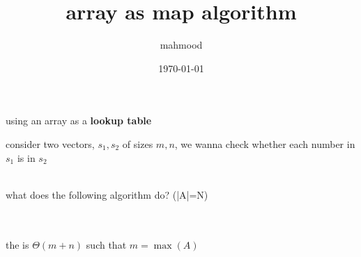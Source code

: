 \documentclass[a4paper,12pt]{article}
\author{mahmood}
\date{\today}
\title{array as map algorithm}
\begin{document}
\maketitle
using an array as a \textbf{lookup table}\\[0pt]
\begin{my_example}
consider two vectors, \(s_1,s_2\) of sizes \(m,n\), we wanna check whether each number in \(s_1\) is in \(s_2\)\\[0pt]
\\[0pt]
\end{my_example}
\begin{question}
what does the following algorithm do? (|A|=N)\\[0pt]
\\[0pt]

\begin{answer}
\\[0pt]

the is \(\Theta(m+n)\) such that \(m = \max(A)\)\\[0pt]
\end{answer}
\end{question}
\end{document}
